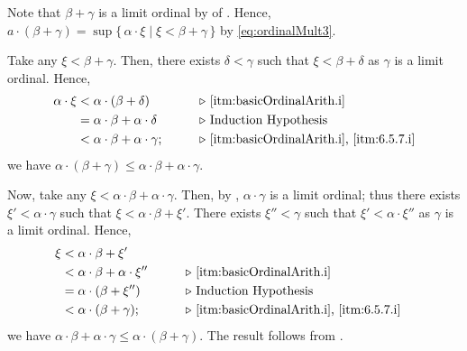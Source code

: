 \documentclass[../introduction_to_set_theory_Note.tex]{subfiles}
\begin{document}
{    Note that \(\beta + \gamma\) is a limit ordinal by  of .
    Hence, \(a \cdot (\beta + \gamma) = \sup \{\,\alpha \cdot \xi \mid \xi < \beta + \gamma\,\}\)
    by \eqref{eq:ordinalMult3}.

    Take any \(\xi < \beta + \gamma\). Then, there exists \(\delta < \gamma\)
    such that \(\xi < \beta + \delta\) as \(\gamma\) is a limit ordinal. Hence,
    \begin{alignat*}{2}
        \alpha \cdot \xi
        &< \alpha \cdot (\beta + \delta) &\qquad& \comment*{\ref{itm:basicOrdinalArith.i}} \\
        &= \alpha \cdot \beta + \alpha \cdot \delta && \comment*{Induction Hypothesis} \\
        &< \alpha \cdot \beta + \alpha \cdot \gamma; && \comment*{\ref{itm:basicOrdinalArith.i}, \ref{itm:6.5.7.i}}
    \end{alignat*}
    we have \(\alpha \cdot (\beta + \gamma) \le \alpha \cdot \beta + \alpha \cdot \gamma\).

    Now, take any \(\xi < \alpha \cdot \beta + \alpha \cdot \gamma\).
    Then, by , \(\alpha \cdot \gamma\) is a limit ordinal;
    thus there exists \(\xi' < \alpha \cdot \gamma\) such that \(\xi < \alpha \cdot \beta + \xi'\).
    There exists \(\xi'' < \gamma\) such that \(\xi' < \alpha \cdot \xi''\)
    as \(\gamma\) is a limit ordinal.
    Hence,
    \begin{alignat*}{2}
        \xi
        &< \alpha \cdot \beta + \xi' \\
        &< \alpha \cdot \beta + \alpha \cdot \xi'' &\qquad& \comment*{\ref{itm:basicOrdinalArith.i}} \\
        &= \alpha \cdot (\beta + \xi'') && \comment*{Induction Hypothesis} \\
        &< \alpha \cdot (\beta + \gamma); && \comment*{\ref{itm:basicOrdinalArith.i}, \ref{itm:6.5.7.i}}
    \end{alignat*}
    we have \(\alpha \cdot \beta + \alpha \cdot \gamma \le \alpha \cdot (\beta + \gamma)\).
    The result follows from .
}
\end{document}
